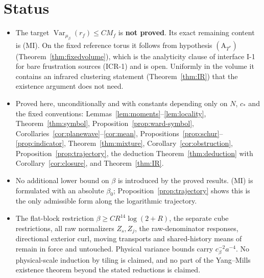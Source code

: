 \documentclass[11pt]{article}
\theoremstyle{definition}
\newcommand{\Var}{\operatorname{Var}}
\begin{document}
\section{Status}

\begin{itemize}
\item The target $\Var_{\mu_\beta}(r_f)\le CM_f$ is \textbf{not proved}. Its exact remaining content is (MI).
On the fixed reference torus it follows from hypothesis $(\mathrm A_{T^*})$ (Theorem~\ref{thm:fixedvolume}), which is
the analyticity clause of interface I-1 for bare frustration sources (ICR-1) and is open. Uniformly in the volume it
contains an infrared clustering statement (Theorem~\ref{thm:IR}) that the existence argument does not need.
\item Proved here, unconditionally and with constants depending only on $N$, $c_*$ and the fixed conventions:
Lemmas~\ref{lem:moments}--\ref{lem:locality}, Theorem~\ref{thm:symbol}, Proposition~\ref{prop:ward-symbol},
Corollaries~\ref{cor:planewave}--\ref{cor:mean}, Propositions~\ref{prop:schur}--\ref{prop:indicator},
Theorem~\ref{thm:mixture}, Corollary~\ref{cor:obstruction}, Proposition~\ref{prop:trajectory}, the
deduction Theorem~\ref{thm:deduction} with Corollary~\ref{cor:closure}, and Theorem~\ref{thm:IR}.
\item No additional lower bound on $\beta$ is introduced by the proved results. (MI) is formulated with an absolute
$\beta_0$; Proposition~\ref{prop:trajectory} shows this is the only admissible form along the logarithmic trajectory.
\item The flat-block restriction $\beta\ge CR^{14}\log(2+R)$, the separate cube restrictions, all raw normalizers
$Z_s,Z_j$, the raw-denominator responses, directional exterior curl, moving transports and shared-history means of
\cite{bhi,wwa,inn,whe,dmn,cur,tra,cub,gau,rsc} remain in force and untouched. Physical variance bounds carry $c_\beta^{-2}a^{-4}$. No physical-scale
induction by tiling is claimed, and no part of the Yang--Mills existence theorem beyond the stated reductions is
claimed.
\end{itemize}
\end{document}
